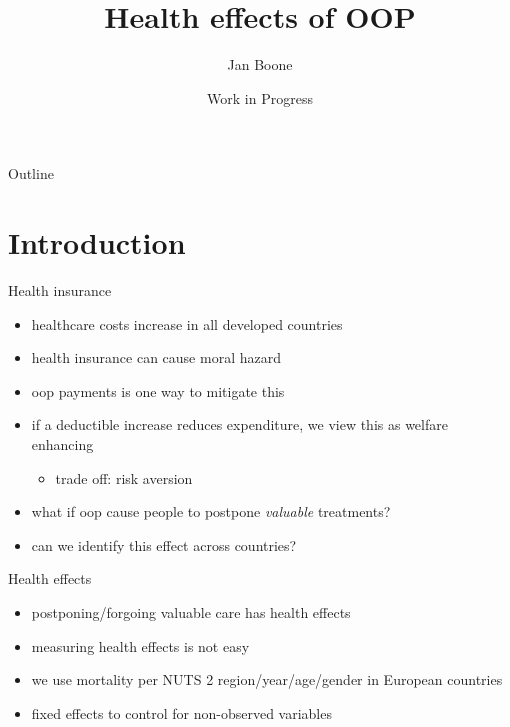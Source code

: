 \documentclass[presentation]{beamer}
\author{Jan Boone}
\date{Work in Progress}
\title{Health effects of OOP}
\begin{document}
\maketitle
\begin{frame}{Outline}
\setcounter{tocdepth}{1}
\tableofcontents
\end{frame}




\section*{Introduction}
\label{sec:orgf846528}

\begin{frame}[label={sec:orgf54505e}]{Health insurance}
\begin{itemize}
\item healthcare costs increase in all developed countries
\item health insurance can cause moral hazard
\item oop payments is one way to mitigate this
\item if a deductible increase reduces expenditure, we view this as welfare enhancing
\begin{itemize}
\item trade off: risk aversion
\end{itemize}
\item what if oop cause people to postpone \emph{valuable} treatments?
\item can we identify this effect across countries?
\end{itemize}
\end{frame}

\begin{frame}[label={sec:org64d728d}]{Health effects}
\begin{itemize}
\item postponing/forgoing valuable care has health effects
\item measuring health effects is not easy
\item we use mortality per NUTS 2 region/year/age/gender in European countries
\item fixed effects to control for non-observed variables
\end{itemize}
\end{frame}
\end{document}
